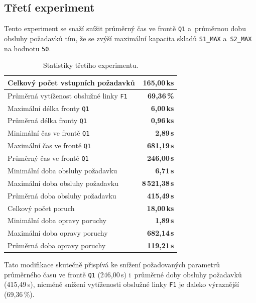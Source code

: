\documentclass[a4paper, 11pt]{article}
\begin{document}
\subsection{Třetí experiment}

Tento experiment se snaží snížit průměrný čas ve frontě \texttt{Q1} a~průměrnou dobu obsluhy požadavků tím, že se zvýší maximální kapacita skladů \texttt{S1\_MAX} a~\texttt{S2\_MAX} na hodnotu \texttt{50}.

\begin{table}[ht!]
    \centering
    \begin{tabular}{|l|r|}
        \hline
        Celkový počet vstupních požadavků & \textbf{165,00\,ks} \\ \hline
        Průměrná vytíženost obslužné linky \texttt{F1} & \textbf{69,36\,\%} \\ \hline
        Maximální délka fronty \texttt{Q1} & \textbf{6,00\,ks} \\ \hline
        Průměrná délka fronty \texttt{Q1} & \textbf{0,96\,ks} \\ \hline
        Minimální čas ve frontě \texttt{Q1} & \textbf{2,89\,s} \\ \hline
        Maximální čas ve frontě \texttt{Q1} & \textbf{681,19\,s} \\ \hline
        Průměrný čas ve frontě \texttt{Q1} & \textbf{246,00\,s} \\ \hline
        Minimální doba obsluhy požadavku & \textbf{6,71\,s} \\ \hline
        Maximální doba obsluhy požadavku & \textbf{8\,521,38\,s} \\ \hline
        Průměrná doba obsluhy požadavku & \textbf{415,49\,s} \\ \hline
        Celkový počet poruch & \textbf{18,00\,ks} \\ \hline
        Minimální doba opravy poruchy & \textbf{1,89\,s} \\ \hline
        Maximální doba opravy poruchy & \textbf{682,14\,s} \\ \hline
        Průměrná doba opravy poruchy & \textbf{119,21\,s} \\ \hline
    \end{tabular}
    \caption{Statistiky třetího experimentu.}
\end{table}

Tato modifikace skutečně přispívá ke snížení požadovaných parametrů průměrného času ve frontě \texttt{Q1} (246,00\,s) i~průměrné doby obsluhy požadavků (415,49\,s), nicméně snížení vytíženosti obslužné linky \texttt{F1} je daleko výraznější (69,36\,\%).
\end{document}
